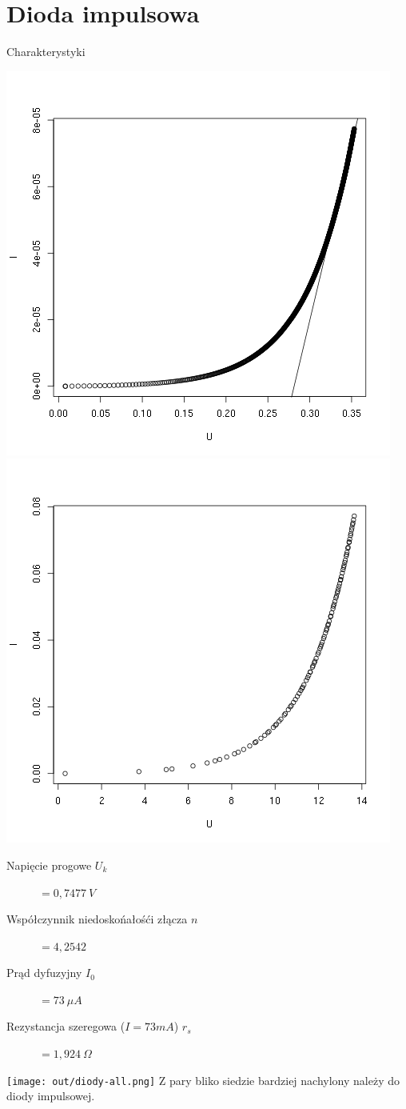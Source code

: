 \documentclass[11pt]{article}
\begin{document}
\section{Dioda impulsowa}
Charakterystyki 
\begin{center}
\includegraphics[scale=0.48]{out/germanowa-normal.png}
\includegraphics[scale=0.48]{out/germanowa-log.png}
\end{center}
\begin{description}
\item[Napięcie progowe $U_k$] $=0,7477\ V$
\item[Współczynnik niedoskońałośći złącza $n$]  $=4,2542$
\item[Prąd dyfuzyjny $I_0$ ] $=73\ \mu A$
\item[Rezystancja szeregowa ($I=73mA$) $r_s$ ] $=1,924\ \Omega$
\end{description}
\newpage
\texttt{[image: out/diody-all.png]}
Z pary bliko siedzie bardziej nachylony należy do diody impulsowej.
\end{document}
